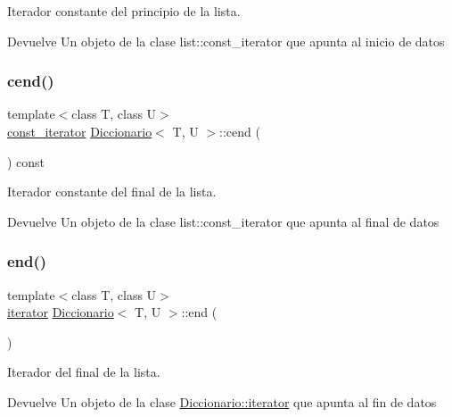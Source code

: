 Iterador constante del principio de la lista. 

\begin{DoxyReturn}{Devuelve}
Un objeto de la clase list\+::const\+\_\+iterator que apunta al inicio de datos 
\end{DoxyReturn}
\mbox{\label{classDiccionario_ac4e5b5c7800bf3df103ca6b58f118598}} 
\subsubsection{\texorpdfstring{cend()}{cend()}}
{\footnotesize\ttfamily template$<$class T, class U$>$ \\
\hyperlink{classDiccionario_1_1const__iterator}{const\+\_\+iterator} \hyperlink{classDiccionario}{Diccionario}$<$ T, U $>$\+::cend (\begin{DoxyParamCaption}{ }\end{DoxyParamCaption}) const}



Iterador constante del final de la lista. 

\begin{DoxyReturn}{Devuelve}
Un objeto de la clase list\+::const\+\_\+iterator que apunta al final de datos 
\end{DoxyReturn}
\mbox{\label{classDiccionario_adb5cdbfce59b4005bd07473273df3a8e}} 
\subsubsection{\texorpdfstring{end()}{end()}}
{\footnotesize\ttfamily template$<$class T, class U$>$ \\
\hyperlink{classDiccionario_1_1iterator}{iterator} \hyperlink{classDiccionario}{Diccionario}$<$ T, U $>$\+::end (\begin{DoxyParamCaption}{ }\end{DoxyParamCaption})}



Iterador del final de la lista. 

\begin{DoxyReturn}{Devuelve}
Un objeto de la clase \hyperlink{classDiccionario_1_1iterator}{Diccionario\+::iterator} que apunta al fin de datos 
\end{DoxyReturn}
\mbox{\label{classDiccionario_a16314351b0600835ade3c7add2ffe040}} 
